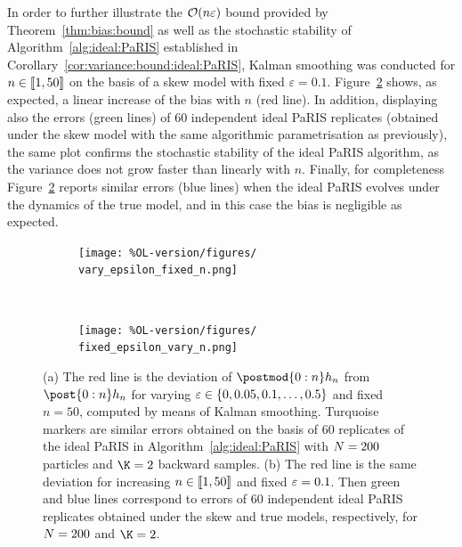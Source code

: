 In order to further illustrate the $\mathcal{O}(n \varepsilon)$ bound provided by Theorem~\ref{thm:bias:bound} as well as the stochastic stability of Algorithm~\ref{alg:ideal:PaRIS} established in Corollary~\ref{cor:variance:bound:ideal:PaRIS}, Kalman smoothing was conducted for $n \in \llbracket 1, 50 \rrbracket$ on the basis of a skew model with fixed $\varepsilon = 0.1$. Figure~\ref{fig:varying:n} shows, as expected, a linear increase of the bias with $n$ (red line). In addition, displaying also the errors (green lines) of $60$ independent ideal PaRIS replicates (obtained under the skew model with the same algorithmic parametrisation as previously), the same plot confirms the stochastic stability of the ideal PaRIS algorithm, as the variance does not grow faster than linearly with $n$. Finally, for completeness Figure~\ref{fig:varying:n} reports similar errors (blue lines) when the ideal PaRIS evolves under the dynamics of the true model, and in this case the bias is negligible as expected.%

\begin{figure}
    \centering
    \begin{subfigure}[b]{0.45\textwidth}
        \texttt{[image: \%OL-version/figures/
        vary\_epsilon\_fixed\_n.png]}
        \caption{}
        \label{fig:varying:precpar}
    \end{subfigure}
    ~ 
    \begin{subfigure}[b]{0.45\textwidth}
        \texttt{[image: \%OL-version/figures/
        fixed\_epsilon\_vary\_n.png]}
        \caption{}
        \label{fig:varying:n}
    \end{subfigure}
    \caption{(a) The red line is the deviation of $\postmod{0:n} h_n$ from $\post{0:n} h_n$ for varying $\varepsilon \in \{0, 0.05, 0.1, \ldots, 0.5 \}$ and fixed $n = 50$, computed by means of Kalman smoothing. Turquoise markers are similar errors obtained on the basis of $60$ replicates of the ideal PaRIS in Algorithm~\ref{alg:ideal:PaRIS} with $N = 200$ particles and $\K = 2$ backward samples. (b) The red line is the same deviation for increasing $n \in \llbracket 1, 50 \rrbracket$ and fixed $\varepsilon = 0.1$. Then green and blue lines correspond to errors of $60$ independent ideal PaRIS replicates obtained under the skew and true models, respectively, for $N = 200$ and $\K = 2$.} \label{fig}
\end{figure}

